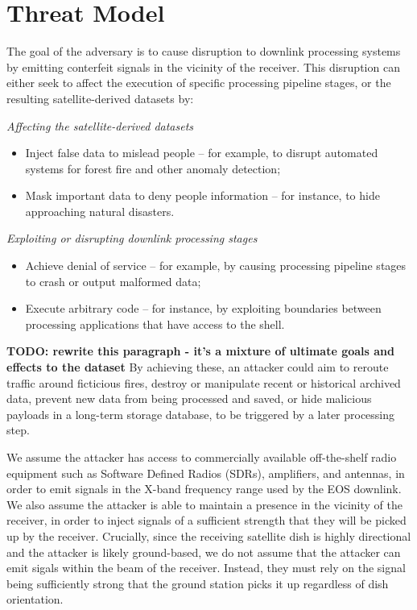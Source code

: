 \section{Threat Model}\label{sec:threat-model}

The goal of the adversary is to cause disruption to downlink processing systems by emitting conterfeit signals in the vicinity of the receiver.
This disruption can either seek to affect the execution of specific processing pipeline stages, or the resulting satellite-derived datasets by:


\noindent\textit{Affecting the satellite-derived datasets}
\begin{itemize}
    \item Inject false data to mislead people -- for example, to disrupt automated systems for forest fire and other anomaly detection;
    \item Mask important data to deny people information -- for instance, to hide approaching natural disasters.
\end{itemize}

\noindent\textit{Exploiting or disrupting downlink processing stages}
\begin{itemize}
    \item Achieve denial of service -- for example, by causing processing pipeline stages to crash or output malformed data;
    \item Execute arbitrary code -- for instance, by exploiting boundaries between processing applications that have access to the shell.
\end{itemize}

\textbf{TODO: rewrite this paragraph - it's a mixture of ultimate goals and effects to the dataset}
By achieving these, an attacker could aim to reroute traffic around ficticious fires, destroy or manipulate recent or historical archived data, prevent new data from being processed and saved, or hide malicious payloads in a long-term storage database, to be triggered by a later processing step.

We assume the attacker has access to commercially available off-the-shelf radio equipment such as Software Defined Radios (SDRs), amplifiers, and antennas, in order to emit signals in the X-band frequency range used by the EOS downlink.
We also assume the attacker is able to maintain a presence in the vicinity of the receiver, in order to inject signals of a sufficient strength that they will be picked up by the receiver.
Crucially, since the receiving satellite dish is highly directional and the attacker is likely ground-based, we do not assume that the attacker can emit sigals within the beam of the receiver.
Instead, they must rely on the signal being sufficiently strong that the ground station picks it up regardless of dish orientation. %


